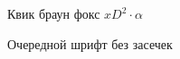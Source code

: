 \documentclass[17pt]{extarticle}
\renewcommand{\alpha}{α}
\begin{document}
Квик браун фокс $xD^2 \cdot \alpha$

Очередной шрифт без засечек
\end{document}

